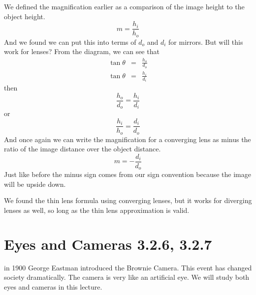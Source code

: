 \documentclass{article}
\begin{document}
We defined the magnification earlier as a comparison of the image height to
the object height. 
\begin{equation}
m=\frac{h_{i}}{h_{o}}
\end{equation}%
And we found we can put this into terms of $d_{o}$ and $d_{i}$ for mirrors.
But will this work for lenses? From the diagram, we can see that 
\begin{eqnarray*}
\tan \theta &=&\frac{h_{o}}{d_{o}} \\
\tan \theta &=&\frac{h_{i}}{d_{i}}
\end{eqnarray*}%
then 
\[
\frac{h_{o}}{d_{o}}=\frac{h_{i}}{d_{i}}
\]%
or 
\[
\frac{h_{i}}{h_{o}}=\frac{d_{i}}{d_{o}}
\]%
And once again we can write the magnification for a converging lens as minus
the ratio of the image distance over the object distance. 
\[
m=-\frac{d_{i}}{d_{o}}
\]%
Just like before the minus sign comes from our sign convention because the
image will be upside down.

We found the thin lens formula using converging lenses, but it works for
diverging lenses as well, so long as the thin lens approximation is valid.

\section{Eyes and Cameras 3.2.6, 3.2.7}

in 1900 George Eastman introduced the Brownie Camera. This event has changed
society dramatically. The camera is very like an artificial eye. We will
study both eyes and cameras in this lecture.

\vspace{0.10in}%
\end{document}
